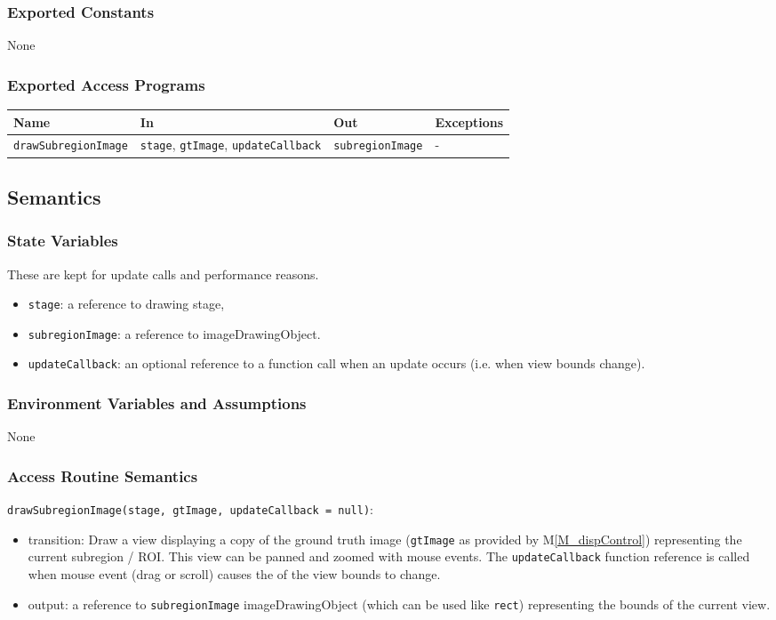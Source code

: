 \documentclass[12pt, titlepage]{article}
\newcommand{\mref}[1]{M\ref{#1}}
\newcommand{\code}[1]{\texttt{#1}}
\begin{document}
\subsubsection{Exported Constants}
None
\subsubsection{Exported Access Programs}

\begin{center}
\begin{tabular}{p{5cm} p{4cm} p{4cm} p{2cm}}
\hline
\textbf{Name} & \textbf{In} & \textbf{Out} & \textbf{Exceptions} \\
\hline
\code{drawSubregionImage} & \code{stage}, \code{gtImage}, \code{updateCallback}
  & \code{subregionImage} & - \\
\hline
\end{tabular}
\end{center}

\subsection{Semantics}

\subsubsection{State Variables}
These are kept for update calls and performance reasons.
\begin{itemize}
  \item \code{stage}: a reference to drawing stage,
  \item \code{subregionImage}: a reference to imageDrawingObject.
  \item \code{updateCallback}: an optional reference to a function call when an update occurs
    (i.e. when view bounds change).
\end{itemize}

\subsubsection{Environment Variables and Assumptions}
None

\subsubsection{Access Routine Semantics}

\noindent \code{drawSubregionImage(stage, gtImage, updateCallback = null)}:
\begin{itemize}
\item transition: Draw a view displaying a copy of the ground truth image
  (\code{gtImage} as provided by \mref{M_dispControl}) representing the current subregion / ROI.
  This view can be panned and zoomed with mouse events.
  The \code{updateCallback} function reference is called when mouse event (drag or scroll) causes the
  of the view bounds to change.
\item output: a reference to \code{subregionImage} imageDrawingObject
  (which can be used like \code{rect}) representing the bounds of the current view.
\end{itemize}
\end{document}
